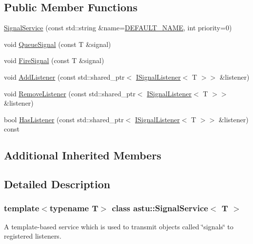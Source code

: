 \subsection*{Public Member Functions}
\begin{DoxyCompactItemize}
\item 
\hyperlink{classastu_1_1SignalService_acf4e3bfbacc9eb6654a84d59b3ff1a6a}{Signal\+Service} (const std\+::string \&name=\hyperlink{classastu_1_1BaseService_a9483b26ad631bd14646ef2d2170cd828}{D\+E\+F\+A\+U\+L\+T\+\_\+\+N\+A\+ME}, int priority=0)
\item 
void \hyperlink{classastu_1_1SignalService_aa028a039b066a779af3834ffb3bdaa18}{Queue\+Signal} (const T \&signal)
\item 
void \hyperlink{classastu_1_1SignalService_a3ead09955e8e76bbdd6d9e5a853e88af}{Fire\+Signal} (const T \&signal)
\item 
void \hyperlink{classastu_1_1SignalService_a9027644028616eb9bad00447648cae29}{Add\+Listener} (const std\+::shared\+\_\+ptr$<$ \hyperlink{classastu_1_1ISignalListener}{I\+Signal\+Listener}$<$ T $>$$>$ \&listener)
\item 
void \hyperlink{classastu_1_1SignalService_aea0777f0393a7f3c4dafff9d58934194}{Remove\+Listener} (const std\+::shared\+\_\+ptr$<$ \hyperlink{classastu_1_1ISignalListener}{I\+Signal\+Listener}$<$ T $>$$>$ \&listener)
\item 
bool \hyperlink{classastu_1_1SignalService_acc4935715afef10b89fd905e714be389}{Has\+Listener} (const std\+::shared\+\_\+ptr$<$ \hyperlink{classastu_1_1ISignalListener}{I\+Signal\+Listener}$<$ T $>$$>$ \&listener) const
\end{DoxyCompactItemize}
\subsection*{Additional Inherited Members}


\subsection{Detailed Description}
\subsubsection*{template$<$typename T$>$\newline
class astu\+::\+Signal\+Service$<$ T $>$}

A template-\/based service which is used to transmit objects called \char`\"{}signals\char`\"{} to registered listeners. 


